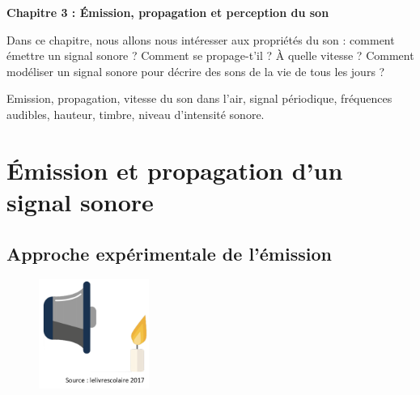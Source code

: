 \renewcommand{\thesubsection}{\textcolor{red}{\Roman{section}.\arabic{subsection}}}
\renewcommand{\thesubsubsection}{\textcolor{red}{\Roman{section}.\arabic{subsection}.\alph{subsubsection}}}

\setcounter{section}{0}
\sndEnTeteCoursTrois

\begin{mdframed}[style=titr, leftmargin=60pt, rightmargin=60pt, innertopmargin=7pt, innerbottommargin=7pt, innerrightmargin=8pt, innerleftmargin=8pt]

\begin{center}
\large{\textbf{Chapitre 3 : \'{E}mission, propagation et perception du son}}
\end{center}
\end{mdframed}
Dans ce chapitre, nous allons nous intéresser aux propriétés du son : comment émettre un signal sonore ? Comment se propage-t'il ? \`{A} quelle vitesse ? Comment modéliser un signal sonore pour décrire des sons de la vie de tous les jours ?

\begin{tcolorbox}[colback=blue!5!white,colframe=blue!75!black,title=Mots clés du chapitre :]
Emission, propagation, vitesse du son dans l'air, signal périodique, fréquences audibles, hauteur, timbre, niveau d'intensité sonore.
\end{tcolorbox}


\section{\'{E}mission et propagation d'un signal sonore}
\subsection{Approche expérimentale de l'émission}
\begin{figure}
\vspace{-1.5cm}
    \centering
     \includegraphics[width=0.32\textwidth]{Images/Haut_parleur_bougie.PNG}
   \end{figure}

